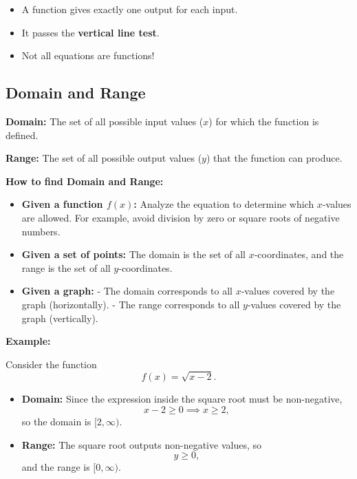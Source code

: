 \documentclass[11pt]{article}
\begin{document}
\begin{tcolorbox}[colback=purple!5!white, colframe=purple!80!black, title=Function Summary]
\begin{itemize}
  \item A function gives exactly one output for each input.
  \item It passes the \textbf{vertical line test}.
  \item Not all equations are functions!
\end{itemize}
\end{tcolorbox}

\subsection{Domain and Range}

\textbf{Domain:} The set of all possible input values (\( x \)) for which the function is defined.

\textbf{Range:} The set of all possible output values (\( y \)) that the function can produce.

\bigskip

\textbf{How to find Domain and Range:}

\begin{itemize}
  \item \textbf{Given a function \( f(x) \):}
  Analyze the equation to determine which \( x \)-values are allowed. For example, avoid division by zero or square roots of negative numbers.

  \medskip

  \item \textbf{Given a set of points:}
  The domain is the set of all \( x \)-coordinates, and the range is the set of all \( y \)-coordinates.

  \medskip

  \item \textbf{Given a graph:}
  - The domain corresponds to all \( x \)-values covered by the graph (horizontally).
  - The range corresponds to all \( y \)-values covered by the graph (vertically).
\end{itemize}

\bigskip

\textbf{Example:}

Consider the function
\[
f(x) = \sqrt{x - 2}.
\]

\begin{itemize}
  \item \textbf{Domain:} Since the expression inside the square root must be non-negative,
  \[
  x - 2 \geq 0 \implies x \geq 2,
  \]
  so the domain is \( [2, \infty) \).

  \item \textbf{Range:} The square root outputs non-negative values, so
  \[
  y \geq 0,
  \]
  and the range is \( [0, \infty) \).
\end{itemize}
\end{document}
